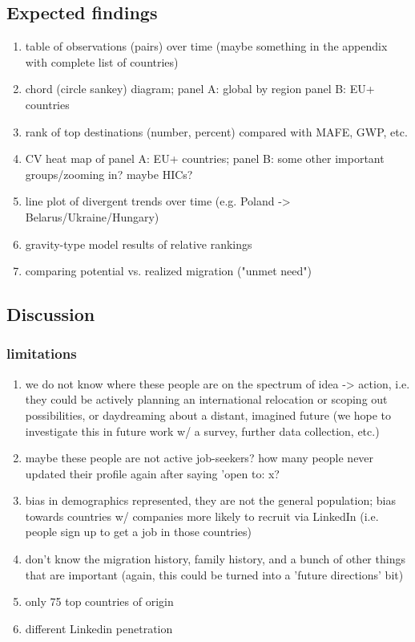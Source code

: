 \subsection*{Expected findings}
\begin{enumerate}
    \item table of observations (pairs) over time (maybe something in the appendix with complete list of countries)
    \item chord (circle sankey) diagram; panel A: global by region panel B: EU+ countries
    \item rank of top destinations (number, percent) compared with MAFE, GWP, etc.
    \item CV heat map of panel A: EU+ countries; panel B: some other important groups/zooming in? maybe HICs?
    \item line plot of divergent trends over time (e.g. Poland -> Belarus/Ukraine/Hungary)
    \item gravity-type model results of relative rankings
    \item comparing potential vs. realized migration ("unmet need")
\end{enumerate}

\subsection*{Discussion}
\subsubsection*{limitations}
\begin{enumerate}
    \item we do not know where these people are on the spectrum of idea -> action, i.e. they could be actively planning an international relocation or scoping out possibilities, or daydreaming about a distant, imagined future (we hope to investigate this in future work w/ a survey, further data collection, etc.)
    \item maybe these people are not active job-seekers? how many people never updated their profile again after saying 'open to: x?
    \item bias in demographics represented, they are not the general population; bias towards countries w/ companies more likely to recruit via LinkedIn (i.e. people sign up to get a job in those countries)
    \item don't know the migration history, family history, and a bunch of other things that are important (again, this could be turned into a 'future directions' bit)
    \item only 75 top countries of origin
    \item different Linkedin penetration
\end{enumerate}
